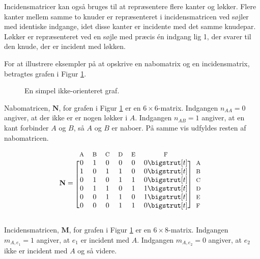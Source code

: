 Incidensmatricer kan også bruges til at repræsentere flere kanter og løkker.
Flere kanter mellem samme to knuder er repræsenteret i incidensmatricen ved søjler med identiske indgange, idet disse kanter er incidente med det samme knudepar.
Løkker er repræsenteret ved en søjle med præcis én indgang lig 1, der svarer til den knude, der er incident med løkken.

\begin{exmp}
	For at illustrere eksempler på at opskrive en nabomatrix og en incidensmatrix, betragtes grafen i Figur \ref{fig:simple_graph_labels}. 
	
	\begin{figure}[h!]
		\centering
		
		\caption{En simpel ikke-orienteret graf.} \label{fig:simple_graph_labels}
	\end{figure}
	
	Nabomatricen, $\mathbf{N}$, for grafen i Figur \ref{fig:simple_graph_labels} er en $6 \times 6$-matrix.
	Indgangen $n_{AA}=0$ angiver, at der ikke er er nogen løkker i $A$.
	Indgangen $n_{AB}=1$ angiver, at en kant forbinder $A$ og $B$, så $A$ og $B$ er naboer.
	På samme vis udfyldes resten af nabomatricen. 
	
	 \begin{equation*}
	  \mathbf{N}=
	  \begin{blockarray}{*{6}{c} l}
	    \begin{block}{*{6}{>{$\footnotesize}c<{$}} l}
	      A & B & C & D & E & F \\
	    \end{block}
	    \begin{block}{[*{6}{c}]>{$\footnotesize}l<{$}}
	      0 & 1 & 0 & 0 & 0 & 0 \bigstrut[t]& A \\
	      1 & 0 & 1 & 1 & 0 & 0 \bigstrut[t]&B \\
	      0 & 1 & 0 & 1 & 1 & 0 \bigstrut[t]&C \\
	      0 & 1 & 1 & 0 & 1 & 1 \bigstrut[t]& D \\
	      0 & 0 & 1 & 1 & 0 & 1 \bigstrut[t]& E \\
	      0 & 0 & 0 & 1 & 1 & 0 \bigstrut[t]& F \\
	    \end{block}
	  \end{blockarray}
	\end{equation*} 
	
	Incidensmatricen, $\mathbf{M}$, for grafen i Figur \ref{fig:simple_graph_labels} er en $6 \times 8$-matrix.
	Indgangen $m_{A,e_1}=1$ angiver, at $e_1$ er incident med $A$.
	Indgangen $m_{A,e_2}=0$ angiver, at $e_2$ ikke er incident med $A$ og så videre.
	

\end{exmp}
